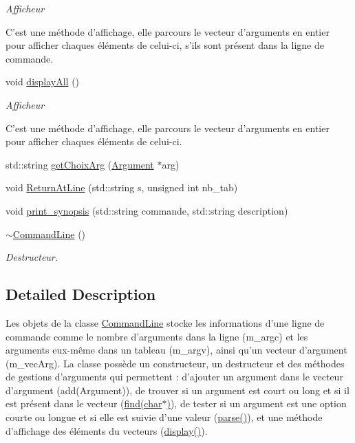 \begin{DoxyCompactItemize}
\begin{DoxyCompactList}\small\item\em Afficheur

C'est une méthode d'affichage, elle parcours le vecteur d'arguments en entier pour afficher chaques éléments de celui-\/ci, s'ils sont présent dans la ligne de commande. \end{DoxyCompactList}\item 
\hypertarget{classCommandLine_a5c75f2e2c604253a476134e0427ede57}{void \hyperlink{classCommandLine_a5c75f2e2c604253a476134e0427ede57}{display\-All} ()}\label{classCommandLine_a5c75f2e2c604253a476134e0427ede57}

\begin{DoxyCompactList}\small\item\em Afficheur

C'est une méthode d'affichage, elle parcours le vecteur d'arguments en entier pour afficher chaques éléments de celui-\/ci. \end{DoxyCompactList}\item 
std\-::string \hyperlink{classCommandLine_a9611a3048e9ce31c91c23a18c6143c60}{get\-Choix\-Arg} (\hyperlink{classArgument}{Argument} $\ast$arg)
\item 
void \hyperlink{classCommandLine_abcbfd8d82d87a58776ce92c1f36f8432}{Return\-At\-Line} (std\-::string s, unsigned int nb\-\_\-tab)
\item 
void \hyperlink{classCommandLine_af1ccfe2c88a4eb39136f94d96592525a}{print\-\_\-synopsis} (std\-::string commande, std\-::string description)
\item 
\hyperlink{classCommandLine_ac359efccafe57f845b1f747a9db3c6d9}{$\sim$\-Command\-Line} ()
\begin{DoxyCompactList}\small\item\em Destructeur. \end{DoxyCompactList}\end{DoxyCompactItemize}


\subsection{Detailed Description}
Les objets de la classe \hyperlink{classCommandLine}{Command\-Line} stocke les informations d'une ligne de commande comme le nombre d'arguments dans la ligne (m\-\_\-argc) et les arguments eux-\/même dans un tableau (m\-\_\-argv), ainsi qu'un vecteur d'argument (m\-\_\-vec\-Arg). La classe possède un constructeur, un destructeur et des méthodes de gestions d'arguments qui permettent \-: d'ajouter un argument dans le vecteur d'argument (add(\-Argument)), de trouver si un argument est court ou long et si il est présent dans le vecteur (\hyperlink{classCommandLine_a884050a7939bd56a166001f162fbfc7b}{find(char$\ast$)}), de tester si un argument est une option courte ou longue et si elle est suivie d'une valeur (\hyperlink{classCommandLine_a62cd80cf6f4f99867034ce43c2c1b94f}{parse()}), et une méthode d'affichage des éléments du vecteurs (\hyperlink{classCommandLine_a611e230a49e8fccc31410aad81c88991}{display()}). 

